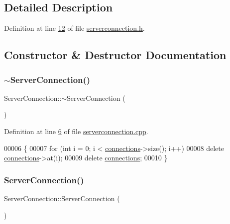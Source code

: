\subsection{Detailed Description}


Definition at line \hyperlink{a00131_source_l00012}{12} of file \hyperlink{a00131_source}{serverconnection.\+h}.



\subsection{Constructor \& Destructor Documentation}
\mbox{\label{a00238_af919491d0e2ff066b0a58cc50fc0d90d}} 
\subsubsection{\texorpdfstring{$\sim$\+Server\+Connection()}{~ServerConnection()}}
{\footnotesize\ttfamily Server\+Connection\+::$\sim$\+Server\+Connection (\begin{DoxyParamCaption}{ }\end{DoxyParamCaption})}



Definition at line \hyperlink{a00128_source_l00006}{6} of file \hyperlink{a00128_source}{serverconnection.\+cpp}.


\begin{DoxyCode}
00006                                     \{
00007   \textcolor{keywordflow}{for} (\textcolor{keywordtype}{int} i = 0; i < \hyperlink{a00238_a7d9e1b1ac7c2d57b439ab5918e7c31d0}{connections}->size(); i++)
00008     \textcolor{keyword}{delete} \hyperlink{a00238_a7d9e1b1ac7c2d57b439ab5918e7c31d0}{connections}->at(i);
00009   \textcolor{keyword}{delete} \hyperlink{a00238_a7d9e1b1ac7c2d57b439ab5918e7c31d0}{connections};
00010 \}
\end{DoxyCode}
\mbox{\label{a00238_a0adf644e7715ddbb83a53651b0804dec}} 
\subsubsection{\texorpdfstring{Server\+Connection()}{ServerConnection()}}
{\footnotesize\ttfamily Server\+Connection\+::\+Server\+Connection (\begin{DoxyParamCaption}{ }\end{DoxyParamCaption})\hspace{0.3cm}{\ttfamily [protected]}}



